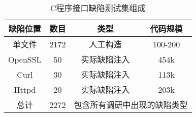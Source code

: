 \begin{table}[t]
	\centering
	\begin{minipage}[t]{0.6\linewidth} %
		\caption{C程序接口缺陷测试集组成}
		\label{tab:4-2-dataset}
			\begin{tabular}{cccc}
			\hline
			缺陷位置 & 数目& 类型& 代码规模\\
			\hline
			单文件 & 2172 & 人工构造 & 100-200\\
			OpenSSL & 50 & 实际缺陷注入 & 454k\\
			Curl & 30 & 实际缺陷注入 & 113k\\
			Httpd & 20 & 实际缺陷注入 & 203k\\
			总计 & 2272 & \multicolumn{2}{c}{包含所有调研中出现的缺陷类型} \\
			\hline
		\end{tabular}
	\end{minipage}
\end{table}